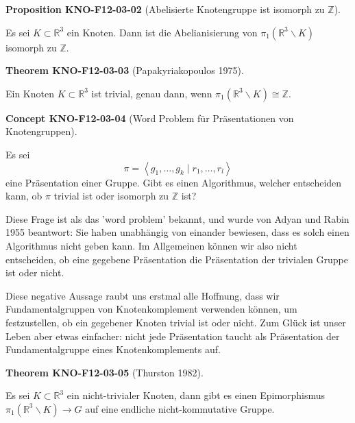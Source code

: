\documentclass[10pt, letterpaper]{article}
\newcommand{\CustomHeading}[3]{%
  \par\medskip\noindent%
  \textbf{#1 #2} \textnormal{(#3)}.\enskip%
}
\newenvironment{PROP}[2]{\CustomHeading{Proposition}{#1}{#2}}{}
\newenvironment{THEO}[2]{\CustomHeading{Theorem}{#1}{#2}}{}
\newenvironment{CONC}[2]{\CustomHeading{Concept}{#1}{#2}}{}
\begin{document}
\begin{PROP}{KNO-F12-03-02}{Abelisierte Knotengruppe ist isomorph zu $\mathbb{Z}$}
Es sei $K \subset \mathbb{R}^3$ ein Knoten. Dann ist die Abelianisierung von $\pi_1\left(\mathbb{R}^3 \backslash K\right)$ isomorph zu $\mathbb{Z}$.
\end{PROP}

\begin{THEO}{KNO-F12-03-03}{Papakyriakopoulos 1975}
Ein Knoten $K \subset \mathbb{R}^3$ ist trivial, genau dann, wenn $\pi_1\left(\mathbb{R}^3 \backslash K\right) \cong \mathbb{Z}$.
\end{THEO}

\begin{CONC}{KNO-F12-03-04}{Word Problem für Präsentationen von Knotengruppen}
Es sei
$$
\pi=\left\langle g_1, \ldots, g_k \mid r_1, \ldots, r_l\right\rangle
$$
eine Präsentation einer Gruppe. Gibt es einen Algorithmus, welcher entscheiden kann, ob $\pi$ trivial ist oder isomorph zu $\mathbb{Z}$ ist?

Diese Frage ist als das 'word problem' bekannt, und wurde von Adyan und Rabin 1955 beantwort: Sie haben unabhängig von einander bewiesen, dass es solch einen Algorithmus nicht geben kann. Im Allgemeinen können wir also nicht entscheiden, ob eine gegebene Präsentation die Präsentation der trivialen Gruppe ist oder nicht.

Diese negative Aussage raubt uns erstmal alle Hoffnung, dass wir Fundamentalgruppen von Knotenkomplement verwenden können, um festzustellen, ob ein gegebener Knoten trivial ist oder nicht. Zum Glück ist unser Leben aber etwas einfacher: nicht jede Präsentation taucht als Präsentation der Fundamentalgruppe eines Knotenkomplements auf.
\end{CONC}

\begin{THEO}{KNO-F12-03-05}{Thurston 1982}
Es sei $K \subset \mathbb{R}^3$ ein nicht-trivialer Knoten, dann gibt es einen Epimorphismus $\pi_1\left(\mathbb{R}^3 \backslash K\right) \rightarrow G$ auf eine endliche nicht-kommutative Gruppe.
\end{THEO}
\end{document}
